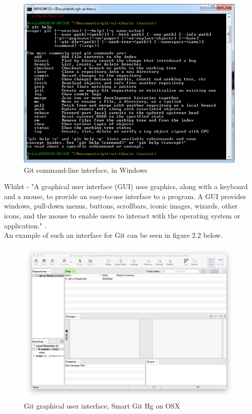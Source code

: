 \documentclass[a4paper,oneside]{bth} %
\begin{document}
			\begin{figure}[H]
				\centering
				\includegraphics[width=0.8\linewidth]{git-cli.jpg}
				\caption{Git command-line interface, in Windows}
				\label{fig:git-cli}
			\end{figure}
			
			Whilst - "A graphical user interface (GUI) uses graphics, along with a keyboard and a mouse, to provide an easy-to-use interface to a program. A GUI provides windows, pull-down menus, buttons, scrollbars, iconic images, wizards, other icons, and the mouse to enable users to interact with the operating system or application." \cite{OracleCLIAndGUI}.\\
			An example of such an interface for Git can be seen in figure 2.2 below.
			
			\begin{figure}[H]
				\centering
				\includegraphics[width=0.8\linewidth]{git-gui.png}
				\caption{Git graphical user interface, Smart Git Hg on OSX}
				\label{fig:git-gui}
			\end{figure}
			
\end{document}
